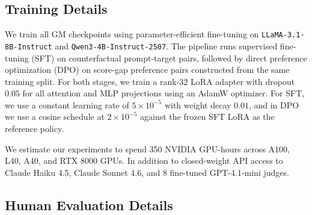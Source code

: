 \documentclass[11pt]{article}
\begin{document}
\subsection{Training Details} \label{apx:training}

We train all GM checkpoints using parameter-efficient fine-tuning on \texttt{LLaMA-3.1-8B-Instruct} and \texttt{Qwen3-4B-Instruct-2507}. The pipeline runs supervised fine-tuning (SFT) on counterfactual prompt-target pairs, followed by direct preference optimization (DPO) on score-gap preference pairs constructed from the same training split. For both stages, we train a rank-$32$ LoRA adapter with dropout $0.05$ for all attention and MLP projections using an AdamW optimizer. For SFT, we use a constant learning rate of $5\!\times\!10^{-5}$ with weight decay $0.01$, and in DPO we use a cosine schedule at $2\!\times\!10^{-5}$ against the frozen SFT LoRA as the reference policy.

We estimate our experiments to spend 350 NVIDIA GPU-hours across A100, L40, A40, and RTX 8000 GPUs. In addition to closed-weight API access to Claude Haiku 4.5, Claude Sonnet 4.6, and 8 fine-tuned GPT-4.1-mini judges.


\subsection{Human Evaluation Details} \label{sec:apdx-human-eval}

\end{document}
